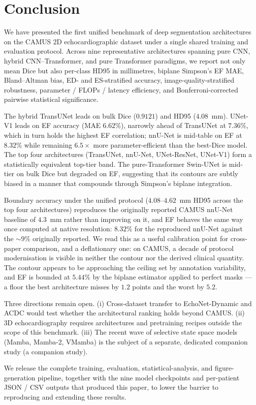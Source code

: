 \section{Conclusion}
\label{sec:conclusion}

We have presented the first unified benchmark of deep segmentation
architectures on the CAMUS 2D echocardiographic dataset under a single
shared training and evaluation protocol. Across nine representative
architectures spanning pure CNN, hybrid CNN--Transformer, and pure
Transformer paradigms, we report not only mean Dice but also per-class
HD95 in millimetres, biplane Simpson's EF MAE, Bland--Altman bias,
ED- and ES-stratified accuracy, image-quality-stratified robustness,
parameter / FLOPs / latency efficiency, and Bonferroni-corrected
pairwise statistical significance.

The hybrid TransUNet leads on bulk Dice ($0.9121$) and HD95
($4.08$~mm). UNet-V1 leads on EF accuracy (MAE $6.62\%$),
narrowly ahead of TransUNet at $7.36\%$, which in turn holds the
highest EF correlation; nnU-Net is mid-table on EF at $8.32\%$ while
remaining $6.5\times$ more parameter-efficient than the best-Dice model.
The top four architectures (TransUNet, nnU-Net, UNet-ResNet, UNet-V1)
form a statistically equivalent top-tier band. The pure-Transformer
Swin-UNet is mid-tier on bulk Dice but degraded on EF, suggesting that
its contours are subtly biased in a manner that compounds through
Simpson's biplane integration.

Boundary accuracy under the unified protocol ($4.08$--$4.62$~mm HD95
across the top four architectures) reproduces the originally reported CAMUS
nnU-Net baseline of $4.3$~mm rather than improving on it, and EF behaves the
same way once computed at native resolution: $8.32\%$ for the reproduced
nnU-Net against the $\sim$$9\%$ originally reported. We read this as a useful
calibration point for cross-paper comparison, and a deflationary one: on
CAMUS, a decade of protocol modernisation is visible in neither the contour
nor the derived clinical quantity. The contour appears to be approaching the
ceiling set by annotation variability, and EF is bounded at $5.44\%$ by the
biplane estimator applied to perfect masks --- a floor the best architecture
misses by $1.2$ points and the worst by $5.2$.

Three directions remain open. (i) Cross-dataset transfer to
EchoNet-Dynamic and ACDC would test whether the architectural ranking
holds beyond CAMUS. (ii) 3D echocardiography requires architectures and
pretraining recipes outside the scope of this benchmark. (iii) The
recent wave of selective state space models (Mamba, Mamba-2, VMamba) is
the subject of a separate, dedicated companion study
(a companion study).

We release the complete training, evaluation, statistical-analysis, and
figure-generation pipeline, together with the nine model checkpoints
and per-patient JSON / CSV outputs that produced this paper, to lower
the barrier to reproducing and extending these results.
